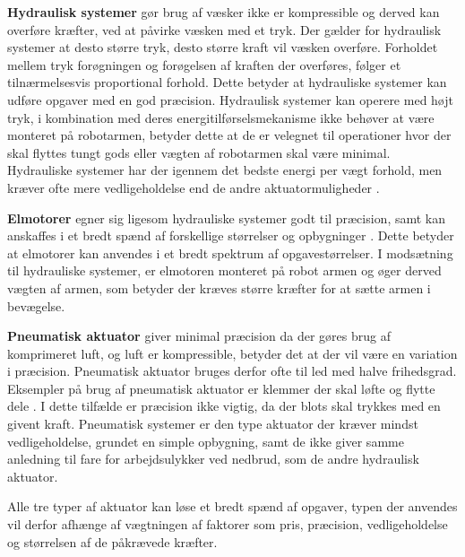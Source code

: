 \textbf{Hydraulisk systemer} gør brug af væsker ikke er kompressible og derved kan overføre kræfter, ved at påvirke væsken med et tryk. Der gælder for hydraulisk systemer at desto større tryk, desto større kraft vil væsken overføre. Forholdet mellem tryk forøgningen og forøgelsen af kraften der overføres, følger et tilnærmelsesvis proportional forhold. Dette betyder at hydrauliske systemer kan udføre opgaver med en god præcision.
 Hydraulisk systemer kan operere med højt tryk, i kombination med deres energitilførselsmekanisme ikke behøver at være monteret på robotarmen, betyder dette at de er velegnet til operationer hvor der skal flyttes tungt gods eller vægten af robotarmen skal være minimal. Hydrauliske systemer har der igennem det bedste energi per vægt forhold, men kræver ofte mere vedligeholdelse end de andre aktuatormuligheder \parencite{Niku2020IntroductionApplications}.

\textbf{Elmotorer} egner sig ligesom hydrauliske systemer godt til præcision, samt kan anskaffes i et bredt spænd af forskellige størrelser og opbygninger \parencite{Kakoty2024IntroductionRobotics}. Dette betyder at elmotorer kan anvendes i et bredt spektrum af opgavestørrelser. I modsætning til hydrauliske systemer, er elmotoren monteret på robot armen og øger derved vægten af armen, som betyder der kræves større kræfter for at sætte armen i bevægelse. 

\textbf{Pneumatisk aktuator} giver minimal præcision da der gøres brug af komprimeret luft, og luft er kompressible, betyder det at der vil være en variation i præcision. Pneumatisk aktuator bruges derfor ofte til led med halve frihedsgrad. Eksempler på brug af pneumatisk aktuator er klemmer der skal løfte og flytte dele \parencite{JHFOSTER2025IdealActuators}. I dette tilfælde er præcision ikke vigtig, da der blots skal trykkes med en givent kraft. Pneumatisk systemer er den type aktuator der kræver mindst vedligeholdelse, grundet en simple opbygning, samt de ikke giver samme anledning til fare for arbejdsulykker ved nedbrud, som de andre hydraulisk aktuator.

Alle tre typer af aktuator kan løse et bredt spænd af opgaver, typen der anvendes vil derfor afhænge af vægtningen af faktorer som pris, præcision, vedligeholdelse og størrelsen af de påkrævede kræfter.